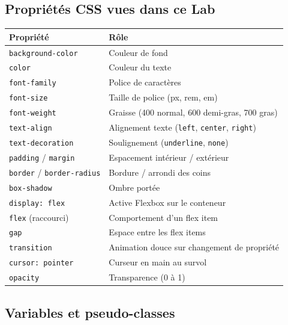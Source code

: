 \documentclass[11pt,a4paper]{article}
\begin{document}
\subsection{Propriétés CSS vues dans ce Lab}

\begin{center}
\begin{tabular}{@{}lp{8cm}@{}}
\toprule
\textbf{Propriété}              & \textbf{Rôle} \\
\midrule
\texttt{background-color}       & Couleur de fond \\
\texttt{color}                  & Couleur du texte \\
\texttt{font-family}            & Police de caractères \\
\texttt{font-size}              & Taille de police (px, rem, em) \\
\texttt{font-weight}            & Graisse (400 normal, 600 demi-gras, 700 gras) \\
\texttt{text-align}             & Alignement texte (\texttt{left}, \texttt{center}, \texttt{right}) \\
\texttt{text-decoration}        & Soulignement (\texttt{underline}, \texttt{none}) \\
\texttt{padding} / \texttt{margin} & Espacement intérieur / extérieur \\
\texttt{border} / \texttt{border-radius} & Bordure / arrondi des coins \\
\texttt{box-shadow}             & Ombre portée \\
\texttt{display: flex}          & Active Flexbox sur le conteneur \\
\texttt{flex} (raccourci)       & Comportement d'un flex item \\
\texttt{gap}                    & Espace entre les flex items \\
\texttt{transition}             & Animation douce sur changement de propriété \\
\texttt{cursor: pointer}        & Curseur en main au survol \\
\texttt{opacity}                & Transparence (0 à 1) \\
\bottomrule
\end{tabular}
\end{center}

\subsection{Variables et pseudo-classes}
\end{document}
